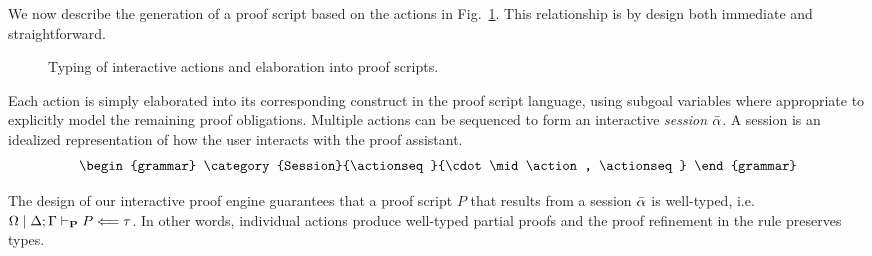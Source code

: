 We now describe the generation of a proof script based on the
actions in Fig.~\ref{fig:interactive}. This relationship is by
design both immediate and straightforward.

\begin{figure}[htp]
  \caption{%
    Typing of interactive actions and elaboration into proof scripts.
  }%
  \label{fig:interactive}%
\end{figure}

Each action is simply elaborated into its corresponding construct in the proof
script language, using subgoal variables where appropriate to explicitly model
the remaining proof obligations.
%
%
%
%
%
Multiple actions can be sequenced to form an interactive
\emph{session} $\bar{\alpha}$. A session is an idealized representation of how the
user interacts with the proof assistant.
%
\[
  \begin{grammar}
    \category{Session}{\actionseq}{\cdot \mid \action, \actionseq}
  \end{grammar}
\]
%

The design of our interactive proof engine guarantees that a proof
script $P$ that results from a session $\bar{\alpha}$ is well-typed,
i.e.~$\Omega \mid \Delta; \Gamma \vdash_\mathbf{P} P \Longleftarrow \tau$. %
In other words, individual actions produce well-typed partial
proofs and the proof refinement in the \isingle{} rule preserves types.

